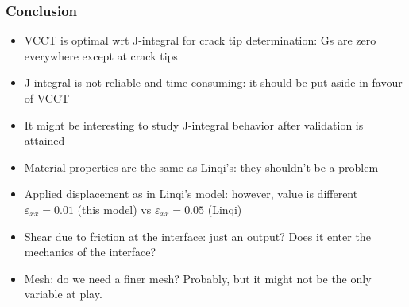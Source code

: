 \documentclass[first,firstsupp,lastsupp,handout,last,hyperref,table]{ETHclass}
\begin{document}
\begin{frame}
\frametitle{Conclusion}
\vspace{-0.85cm}
\scriptsize
\begin{itemize}[label=]
\item VCCT is optimal wrt J-integral for crack tip determination: Gs are zero everywhere except at crack tips
\item J-integral is not reliable and time-consuming: it should be put aside in favour of VCCT
\item It might be interesting to study J-integral behavior after validation is attained
\item Material properties are the same as Linqi's: they shouldn't be a problem
\item Applied displacement as in Linqi's model: however, value is different $\varepsilon_{xx}=0.01$ (this model) vs $\varepsilon_{xx}=0.05$ (Linqi)
\item Shear due to friction at the interface: just an output? Does it enter the mechanics of the interface?
\item Mesh: do we need a finer mesh? Probably, but it might not be the only variable at play.
\end{itemize}
\end{frame}
\end{document}
